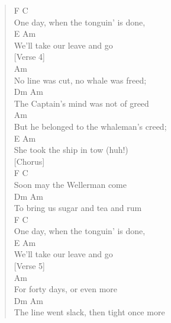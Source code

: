 \documentclass[11pt]{article}
\begin{document}
\begin{verse}
F                 C\\
One day, when the tonguin’ is done,\\
\hspace*{7em}E                 Am\\
We’ll take our leave and go\\
\vspace*{1em}
[Verse 4]\\
\vspace*{1em}
\hspace*{4em}Am\\
No line was cut, no whale was freed;\\
\hspace*{5em}Dm                Am\\
The Captain's mind was not of greed\\
\hspace*{4em}Am\\
But he belonged to the whaleman's creed;\\
\hspace*{5em}E                Am\\
She took the ship in tow (huh!)\\
\vspace*{1em}
[Chorus]\\
\vspace*{1em}
\hspace*{1em}F            C\\
Soon may the Wellerman come\\
\hspace*{4em}Dm                 Am\\
To bring us sugar and tea and rum\\
F                 C\\
One day, when the tonguin’ is done,\\
\hspace*{7em}E                 Am\\
We’ll take our leave and go\\
\vspace*{1em}
[Verse 5]\\
\vspace*{1em}
\hspace*{5em}Am\\
For forty days, or even more\\
\hspace*{5em}Dm                    Am\\
The line went slack, then tight once more\\

\end{verse}
\end{document}
